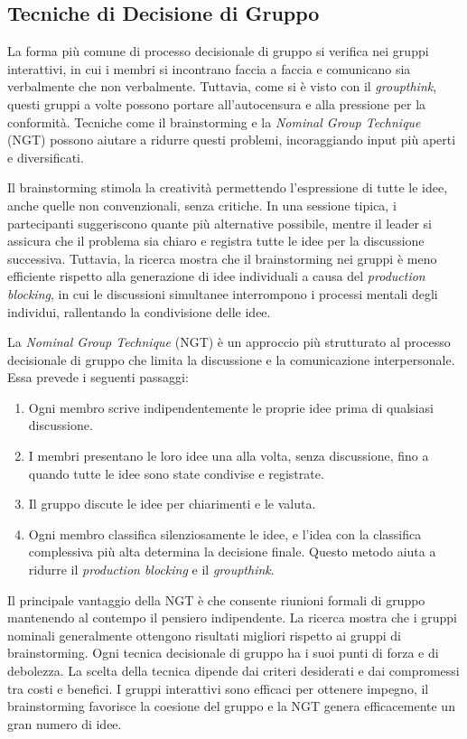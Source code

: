 \documentclass{article}
\begin{document}
\subsection{Tecniche di Decisione di Gruppo}
La forma più comune di processo decisionale di gruppo si verifica nei gruppi interattivi, in cui i membri si incontrano faccia a faccia e comunicano sia verbalmente che non verbalmente. Tuttavia, come si è visto con il \textit{groupthink}, questi gruppi a volte possono portare all'autocensura e alla pressione per la conformità. Tecniche come il brainstorming e la \textit{Nominal Group Technique} (NGT) possono aiutare a ridurre questi problemi, incoraggiando input più aperti e diversificati.


Il brainstorming stimola la creatività permettendo l'espressione di tutte le idee, anche quelle non convenzionali, senza critiche. In una sessione tipica, i partecipanti suggeriscono quante più alternative possibile, mentre il leader si assicura che il problema sia chiaro e registra tutte le idee per la discussione successiva. Tuttavia, la ricerca mostra che il brainstorming nei gruppi è meno efficiente rispetto alla generazione di idee individuali a causa del \textit{production blocking}, in cui le discussioni simultanee interrompono i processi mentali degli individui, rallentando la condivisione delle idee.


La \textit{Nominal Group Technique} (NGT) è un approccio più strutturato al processo decisionale di gruppo che limita la discussione e la comunicazione interpersonale. Essa prevede i seguenti passaggi:
\begin{enumerate}
    \item Ogni membro scrive indipendentemente le proprie idee prima di qualsiasi discussione.
    \item I membri presentano le loro idee una alla volta, senza discussione, fino a quando tutte le idee sono state condivise e registrate.
    \item Il gruppo discute le idee per chiarimenti e le valuta.
    \item Ogni membro classifica silenziosamente le idee, e l'idea con la classifica complessiva più alta determina la decisione finale. Questo metodo aiuta a ridurre il \textit{production blocking} e il \textit{groupthink}.
\end{enumerate}

Il principale vantaggio della NGT è che consente riunioni formali di gruppo mantenendo al contempo il pensiero indipendente. La ricerca mostra che i gruppi nominali generalmente ottengono risultati migliori rispetto ai gruppi di brainstorming. Ogni tecnica decisionale di gruppo ha i suoi punti di forza e di debolezza. La scelta della tecnica dipende dai criteri desiderati e dai compromessi tra costi e benefici. I gruppi interattivi sono efficaci per ottenere impegno, il brainstorming favorisce la coesione del gruppo e la NGT genera efficacemente un gran numero di idee.
\end{document}
